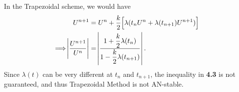 \documentclass[11pt]{article}
\begin{document}
\subsection{}
In the Trapezoidal scheme, we would have 
\begin{equation}\begin{split}
    U^{n+1} &= U^n + \dfrac k2 \Big[ \lambda(t_nU^n + \lambda(t_{n+1})U^{n+1})\Big]\\
    \Longrightarrow
    \abs{\dfrac{U^{n+1}}{U^n}} &= \abs{\dfrac{1+\dfrac k2\lambda(t_n)}
        {1-\dfrac k2 \lambda(t_{n+1})}}.
\end{split}\end{equation}
Since $\lambda(t)$ can be very different at $t_n$ and $t_{n+1}$, 
the inequality in \textbf{4.3} is not guaranteed, and thus Trapezoidal Method is not AN-stable.
\end{document}
